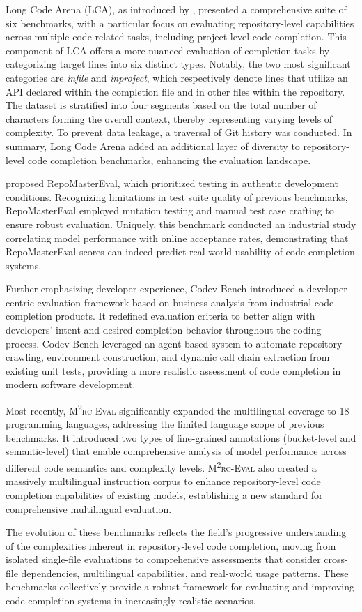 Long Code Arena (LCA), as introduced by \citet{bogomolov2024}, presented a comprehensive suite of six benchmarks, with a particular focus on evaluating repository-level capabilities across multiple code-related tasks, including project-level code completion. This component of LCA offers a more nuanced evaluation of completion tasks by categorizing target lines into six distinct types. Notably, the two most significant categories are \textit{infile} and \textit{inproject}, which respectively denote lines that utilize an API declared within the completion file and in other files within the repository. The dataset is stratified into four segments based on the total number of characters forming the overall context, thereby representing varying levels of complexity. To prevent data leakage, a traversal of Git history was conducted. In summary, Long Code Arena added an additional layer of diversity to repository-level code completion benchmarks, enhancing the evaluation landscape.

\citet{wu2024b} proposed RepoMasterEval, which prioritized testing in authentic development conditions. Recognizing limitations in test suite quality of previous benchmarks, RepoMasterEval employed mutation testing and manual test case crafting to ensure robust evaluation. Uniquely, this benchmark conducted an industrial study correlating model performance with online acceptance rates, demonstrating that RepoMasterEval scores can indeed predict real-world usability of code completion systems.

Further emphasizing developer experience, Codev-Bench \parencite{pan2024} introduced a developer-centric evaluation framework based on business analysis from industrial code completion products. It redefined evaluation criteria to better align with developers' intent and desired completion behavior throughout the coding process. Codev-Bench leveraged an agent-based system to automate repository crawling, environment construction, and dynamic call chain extraction from existing unit tests, providing a more realistic assessment of code completion in modern software development.

Most recently, \textsc{M\textsuperscript{2}rc-Eval} \parencite{liu2024} significantly expanded the multilingual coverage to 18 programming languages, addressing the limited language scope of previous benchmarks. It introduced two types of fine-grained annotations (bucket-level and semantic-level) that enable comprehensive analysis of model performance across different code semantics and complexity levels. \textsc{M\textsuperscript{2}rc-Eval} also created a massively multilingual instruction corpus to enhance repository-level code completion capabilities of existing models, establishing a new standard for comprehensive multilingual evaluation.

The evolution of these benchmarks reflects the field's progressive understanding of the complexities inherent in repository-level code completion, moving from isolated single-file evaluations to comprehensive assessments that consider cross-file dependencies, multilingual capabilities, and real-world usage patterns. These benchmarks collectively provide a robust framework for evaluating and improving code completion systems in increasingly realistic scenarios.
